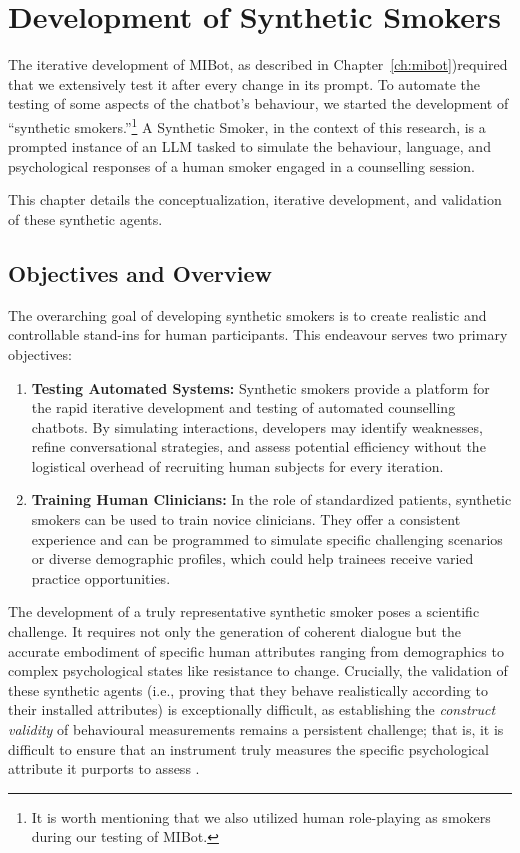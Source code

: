 \chapter{Development of Synthetic Smokers}
\label{ch:synthetic-smoker}

The iterative development of MIBot, as described in Chapter~\ref{ch:mibot})required that we extensively test it after every change in its prompt. To automate the testing of some aspects of the chatbot's behaviour, we started the development of ``synthetic smokers.''\footnote{It is worth mentioning that we also utilized human role-playing as smokers during our testing of MIBot.} A Synthetic Smoker, in the context of this research, is a prompted instance of an LLM tasked to simulate the behaviour, language, and psychological responses of a human smoker engaged in a counselling session.

This chapter details the conceptualization, iterative development, and validation of these synthetic agents.

\section{Objectives and Overview}
\label{sec:synthetic-smoker-goals}

The overarching goal of developing synthetic smokers is to create realistic and controllable stand-ins for human participants. This endeavour serves two primary objectives:

\begin{enumerate}
    \item \textbf{Testing Automated Systems:} Synthetic smokers provide a platform for the rapid iterative development and testing of automated counselling chatbots. By simulating interactions, developers may identify weaknesses, refine conversational strategies, and assess potential efficiency without the logistical overhead of recruiting human subjects for every iteration.
    \item \textbf{Training Human Clinicians:} In the role of standardized patients, synthetic smokers can be used to train novice clinicians. They offer a consistent experience and can be programmed to simulate specific challenging scenarios or diverse demographic profiles, which could help trainees receive varied practice opportunities.
\end{enumerate}

The development of a truly representative synthetic smoker poses a scientific challenge. It requires not only the generation of coherent dialogue but the accurate embodiment of specific human attributes ranging from demographics to complex psychological states like resistance to change. Crucially, the validation of these synthetic agents (i.e., proving that they behave realistically according to their installed attributes) is exceptionally difficult, as establishing the \textit{construct validity} of behavioural measurements remains a persistent challenge; that is, it is difficult to ensure that an instrument truly measures the specific psychological attribute it purports to assess \cite{Cronbach1955}.


